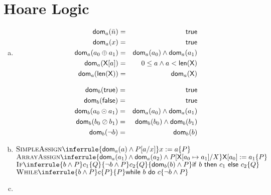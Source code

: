 \section{Hoare Logic}

\newcommand{\dom}{{\sf dom}}
\newcommand{\ifstmt}[3]{{\sf if}~#1~{\sf then}~#2~{\sf else}~#3}
\newcommand{\whilestmt}[2]{{\sf while}~#1~{\sf do}~#2}

\begin{enumerate}[(a)]
    \item \begin{eqnarray*}
        \dom_a(\bar{n})        & = & {\sf true} \\
        \dom_a(x)              & = & {\sf true} \\
        \dom_a(a_0 \oplus a_1) & = & \dom_a(a_0) \wedge \dom_a(a_1) \\
        \dom_a({\sf X}[a])     & = & 0 \leq a \wedge a < {\sf len(X)} \\
        \dom_a({\sf len(X)})   & = & \dom_a({\sf X})
    \end{eqnarray*}

    \begin{eqnarray*}
        \dom_b({\sf true})      & = & {\sf true} \\
        \dom_b({\sf false})     & = & {\sf true} \\
        \dom_b(a_0 \odot a_1)   & = & \dom_a(a_0) \wedge \dom_a(a_1) \\
        \dom_b(b_0 \oslash b_1) & = & \dom_b(b_0) \wedge \dom_b(b_1) \\
        \dom_b(\neg b)          & = & \dom_b(b) \\
    \end{eqnarray*}

    \item
    $
    \Rule{SimpleAssign}{}{
        \{ \dom_a(a) \wedge P[a / x]\}
        x := a
        \{ P \}
    }
    $
    \\

    $
    \Rule{ArrayAssign}{}{
        \{ \dom_a(a_1) \wedge \dom_a(a_2) \wedge P[{\sf X}[a_0 \mapsto a_1] / X \}
        {\sf X}[a_0] := a_1
        \{ P \}
    }
    $
    \\

    $
    \Rule{If}{
        \{ b \wedge P \}
        c_1
        \{ Q \}
        \\
        \{ \neg b \wedge P \}
        c_2
        \{ Q \}
    }{
        \{ \dom_b(b) \wedge P \}
        \ifstmt{b}{c_1}{c_2}
        \{ Q \}
    }
    $
    \\

    $\Rule{While}{
        \{ b \wedge P \}
        c
        \{ P \}
    }{
        \{ P \}
        \whilestmt{b}{c}
        \{ \neg b \wedge P \}
    }$
    \item
\end{enumerate}
